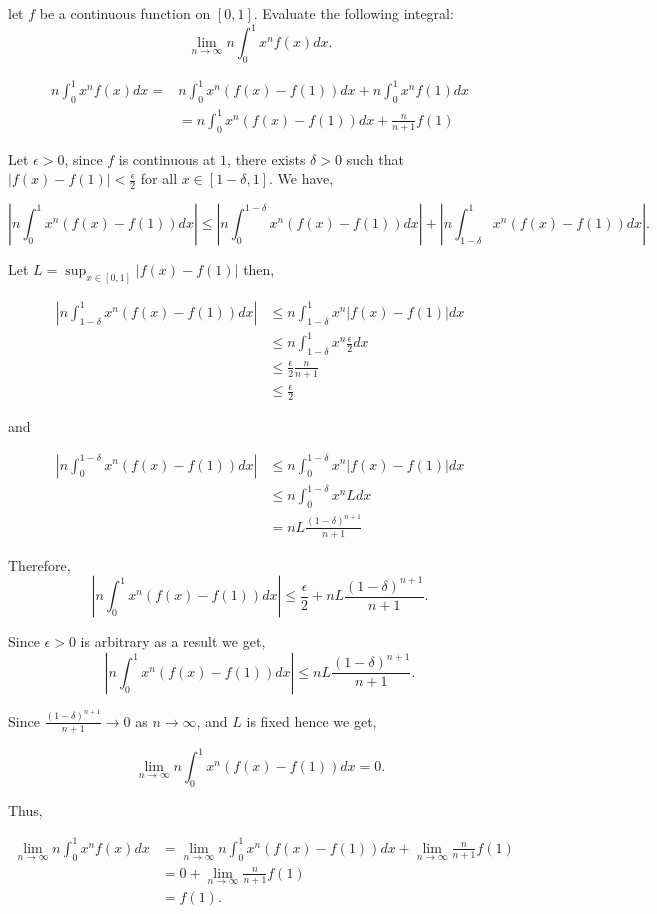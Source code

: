 \question let $f$ be a continuous function on $[0,1]$. Evaluate the following integral:
$$\lim_{n\to\infty}{n\int_{0}^{1}{x^nf(x)dx}}.$$
\begin{solution}
    \begin{align*}
        n\int_{0}^{1}{x^nf(x)dx}=&n\int_{0}^{1}{x^n(f(x)-f(1))dx}+n\int_{0}^{1}{x^nf(1)dx}\\
        &=n\int_{0}^{1}{x^n(f(x)-f(1))dx}+\frac{n}{n+1}f(1)
        \end{align*}
        
        Let $\epsilon>0$, since $f$ is continuous at $1$, there exists $\delta>0$ such that $|f(x)-f(1)|<\frac{\epsilon}{2}$ for all $x\in[1-\delta,1]$. We have,

        $$\left|n\int_{0}^{1}{x^n(f(x)-f(1))dx}\right|\leq\left|n\int_{0}^{1-\delta}{x^n(f(x)-f(1))dx}\right|+\left|n\int_{1-\delta}^{1}{x^n(f(x)-f(1))dx}\right|.$$
        
        Let $L=\displaystyle\sup_{x\in[0,1]}{|f(x)-f(1)|}$ then, 
        
        \begin{align*}
        \left|n\int_{1-\delta}^{1}{x^n(f(x)-f(1))dx}\right|&\leq n\int_{1-\delta}^{1}{x^n|f(x)-f(1)|dx}\\
        &\leq n\int_{1-\delta}^{1}{x^n\frac{\epsilon}{2}dx}\\
        &\leq \frac{\epsilon}{2}\frac{n}{n+1}\\
        &\leq \frac{\epsilon}{2}
        \end{align*}
        
        and
        
        \begin{align*}
        \left|n\int_{0}^{1-\delta}{x^n(f(x)-f(1))dx}\right|&\leq n\int_{0}^{1-\delta}{x^n|f(x)-f(1)|dx}\\
        &\leq n\int_{0}^{1-\delta}{x^nLdx}\\
        &=nL\frac{(1-\delta)^{n+1}}{n+1}
        \end{align*}
        
        Therefore,
        $$\left|n\int_{0}^{1}{x^n(f(x)-f(1))dx}\right|\leq \frac{\epsilon}{2}+nL\frac{(1-\delta)^{n+1}}{n+1}.$$
        
        Since $\epsilon>0$ is arbitrary as a result we get,
        $$\left|n\int_{0}^{1}{x^n(f(x)-f(1))dx}\right|\leq nL\frac{(1-\delta)^{n+1}}{n+1}.$$
        
        Since $\frac{(1-\delta)^{n+1}}{n+1}\to 0$ as $n\to\infty$, and $L$ is fixed hence we get,
        
        $$\lim_{n\to\infty}{n\int_{0}^{1}{x^n(f(x)-f(1))dx}}=0.$$
        
        Thus,
        
        \begin{align*}
        \lim_{n\to\infty}{n\int_{0}^{1}{x^nf(x)dx}}&=\lim_{n\to\infty}{n\int_{0}^{1}{x^n(f(x)-f(1))dx}}+\lim_{n\to\infty}{\frac{n}{n+1}f(1)}\\
        &=0+\lim_{n\to\infty}{\frac{n}{n+1}f(1)}\\
        &=f(1).
        \end{align*}
\end{solution}

